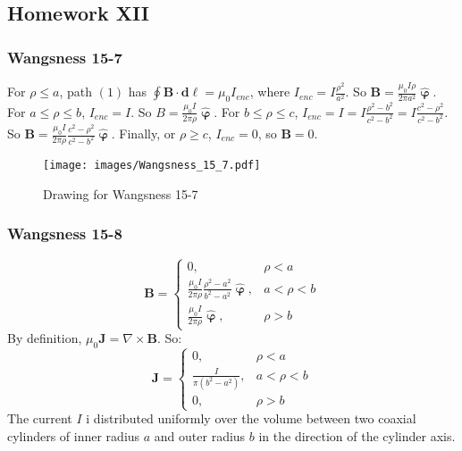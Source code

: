         \subsection{Homework XII}
            \subsubsection{Wangsness 15-7}
            For $\rho\leq a$, path $(1)$ has $\oint \mathbf{B}\cdot \mathbf{d\ell}= \mu_0 I_{enc}$, where $I_{enc} = I\frac{\rho^2}{a^2}$. So $\mathbf{B} = \frac{\mu_0 I\rho}{2\pi a^2} \hat{\boldsymbol{\upvarphi}}$. For $a\leq \rho \leq b$, $I_{enc} = I$. So $B = \frac{\mu_0 I}{2\pi \rho} \hat{\boldsymbol{\upvarphi}}$. For $b\leq \rho \leq c$, $I_{enc} = I =I\frac{\rho^2-b^2}{c^2-b^2} = I\frac{c^2-\rho^2}{c^2-b^2}$. So $\mathbf{B} = \frac{\mu_0 I}{2\pi \rho} \frac{c^2-\rho^2}{c^2-b^2}\hat{\boldsymbol{\upvarphi}}$. Finally, or $\rho \geq c$, $I_{enc} = 0$, so $\mathbf{B} = 0$.
            \begin{figure}[htbp]
                \centering
                \captionsetup{type=figure}
                \texttt{[image: images/Wangsness\_15\_7.pdf]}
                \caption{Drawing for Wangsness 15-7}
            \end{figure}
            \subsubsection{Wangsness 15-8}
            \begin{equation*}
                \mathbf{B}=
                    \begin{cases}
                        0,&\rho<a\\
                        \frac{\mu_0 I}{2\pi \rho}
                        \frac{\rho^2-a^2}{b^2-a^2}
                        \hat{\boldsymbol{\upvarphi}},
                        &a<\rho<b\\
                        \frac{\mu_0 I}{2\pi \rho} \hat{\boldsymbol{\upvarphi}},
                        &\rho>b
                    \end{cases}    
            \end{equation*}
            By definition, $\mu_0 \mathbf{J} = \nabla \times \mathbf{B}$. So:
            \begin{equation*}
                \mathbf{J} = \begin{cases} 0, & \rho<a\\ \frac{I}{\pi(b^2-a^2)}, & a<\rho < b\\ 0, & \rho>b \end{cases}    
            \end{equation*}
            The current $I$ i distributed uniformly over the volume between two coaxial cylinders of inner radius $a$ and outer radius $b$ in the direction of the cylinder axis.
